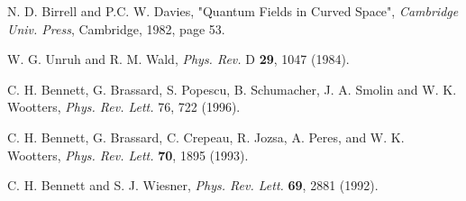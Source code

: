 \documentclass[12pt]{article}
\begin{document}
\begin{thebibliography}{99}
 N. D. Birrell and P.C. W. Davies,
{"Quantum Fields in Curved Space"}, {\it Cambridge Univ. Press},
Cambridge,
1982, page 53.

 W. G. Unruh and R. M. Wald,
 {\it Phys. Rev.} D {\bf
29},
1047 (1984).


 C. H. Bennett, G. Brassard, S. Popescu,
B. Schumacher, J. A. Smolin and W. K. Wootters,
 {\it Phys. Rev.
Lett.} 76, 722 (1996).

 C. H. Bennett, G. Brassard, C. Crepeau,
R. Jozsa,
A. Peres, and W. K. Wootters,
{\it Phys. Rev. Lett.} {\bf 70}, 1895 (1993).



 C. H. Bennett and S. J. Wiesner,
{\it Phys. Rev.
Lett.} {\bf 69}, 2881 (1992).



\end{thebibliography}
\end{document}
